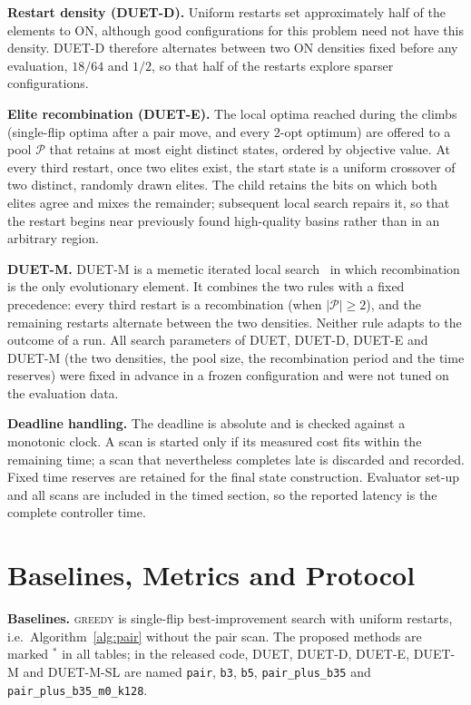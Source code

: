 \documentclass[runningheads]{llncs}
\newcommand{\duet}{\mbox{DUET}}\newcommand{\duetD}{\mbox{DUET-D}}\newcommand{\duetE}{\mbox{DUET-E}}
\newcommand{\bts}{\mbox{DUET-M}}
\begin{document}
\textbf{Restart density (\duetD{}).} Uniform restarts set approximately half of the elements to ON, although good configurations for this problem need not have this density. \duetD{} therefore alternates between two ON densities fixed before any evaluation, $18/64$ and $1/2$, so that half of the restarts explore sparser configurations.

\textbf{Elite recombination (\duetE{}).} The local optima reached during the climbs (single-flip optima after a pair move, and every 2-opt optimum) are offered to a pool $\mathcal P$ that retains at most eight distinct states, ordered by objective value. At every third restart, once two elites exist, the start state is a uniform crossover of two distinct, randomly drawn elites. The child retains the bits on which both elites agree and mixes the remainder; subsequent local search repairs it, so that the restart begins near previously found high-quality basins rather than in an arbitrary region.

\textbf{\bts{}.} \bts{} is a memetic iterated local search~\cite{lourenco2010ils,merz2004memetic} in which recombination is the only evolutionary element. It combines the two rules with a fixed precedence: every third restart is a recombination (when $|\mathcal P|\ge2$), and the remaining restarts alternate between the two densities. Neither rule adapts to the outcome of a run. All search parameters of \duet{}, \duetD{}, \duetE{} and \bts{} (the two densities, the pool size, the recombination period and the time reserves) were fixed in advance in a frozen configuration and were not tuned on the evaluation data.

\textbf{Deadline handling.} The deadline is absolute and is checked against a monotonic clock. A scan is started only if its measured cost fits within the remaining time; a scan that nevertheless completes late is discarded and recorded. Fixed time reserves are retained for the final state construction. Evaluator set-up and all scans are included in the timed section, so the reported latency is the complete controller time.

\section{Baselines, Metrics and Protocol}\label{sec:protocol}
\textbf{Baselines.} \textsc{greedy} is single-flip best-improvement search with uniform restarts, i.e.\ Algorithm~\ref{alg:pair} without the pair scan. The proposed methods are marked $^\ast$ in all tables; in the released code, \duet{}, \duetD{}, \duetE{}, \bts{} and \bts{}-SL are named \texttt{pair}, \texttt{b3}, \texttt{b5}, \texttt{pair\_plus\_b35} and \texttt{pair\_plus\_b35\_m0\_k128}.
\end{document}
